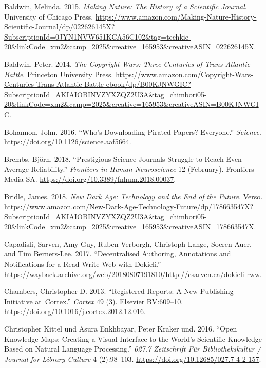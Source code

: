 \documentclass[a4paper]{article}
\begin{document}
\leavevmode\hypertarget{ref-isbn:9780226261454}{}%
Baldwin, Melinda. 2015. \emph{Making Nature: The History of a Scientific
Journal}. University of Chicago Press.
\url{https://www.amazon.com/Making-Nature-History-Scientific-Journal/dp/022626145X?SubscriptionId=0JYN1NVW651KCA56C102\&tag=techkie-20\&linkCode=xm2\&camp=2025\&creative=165953\&creativeASIN=022626145X}.

\leavevmode\hypertarget{ref-isbn:9781400851911}{}%
Baldwin, Peter. 2014. \emph{The Copyright Wars: Three Centuries of
Trans-Atlantic Battle}. Princeton University Press.
\url{https://www.amazon.com/Copyright-Wars-Centuries-Trans-Atlantic-Battle-ebook/dp/B00KJNWGIC?SubscriptionId=AKIAIOBINVZYXZQZ2U3A\&tag=chimbori05-20\&linkCode=xm2\&camp=2025\&creative=165953\&creativeASIN=B00KJNWGIC}.

\leavevmode\hypertarget{ref-doi:10.1126ux2fscience.aaf5664}{}%
Bohannon, John. 2016. ``Who's Downloading Pirated Papers? Everyone.''
\emph{Science}. \url{https://doi.org/10.1126/science.aaf5664}.

\leavevmode\hypertarget{ref-doi:10.3389ux2ffnhum.2018.00037}{}%
Brembs, Björn. 2018. ``Prestigious Science Journals Struggle to Reach
Even Average Reliability.'' \emph{Frontiers in Human Neuroscience} 12
(February). Frontiers Media SA.
\url{https://doi.org/10.3389/fnhum.2018.00037}.

\leavevmode\hypertarget{ref-isbn:9781786635471}{}%
Bridle, James. 2018. \emph{New Dark Age: Technology and the End of the
Future}. Verso.
\url{https://www.amazon.com/New-Dark-Age-Technology-Future/dp/178663547X?SubscriptionId=AKIAIOBINVZYXZQZ2U3A\&tag=chimbori05-20\&linkCode=xm2\&camp=2025\&creative=165953\&creativeASIN=178663547X}.

\leavevmode\hypertarget{ref-dokieli}{}%
Capadisli, Sarven, Amy Guy, Ruben Verborgh, Christoph Lange, Soeren
Auer, and Tim Berners-Lee. 2017. ``Decentralised Authoring, Annotations
and Notifications for a Read-Write Web with Dokieli.''
\url{https://wayback.archive.org/web/20180807191810/http://csarven.ca/dokieli-rww}.

\leavevmode\hypertarget{ref-doi:10.1016ux2fj.cortex.2012.12.016}{}%
Chambers, Christopher D. 2013. ``Registered Reports: A New Publishing
Initiative at~Cortex.'' \emph{Cortex} 49 (3). Elsevier BV:609--10.
\url{https://doi.org/10.1016/j.cortex.2012.12.016}.

\leavevmode\hypertarget{ref-doi:10.12685ux2f027.7-4-2-157}{}%
Christopher Kittel und Asura Enkhbayar, Peter Kraker und. 2016. ``Open
Knowledge Maps: Creating a Visual Interface to the World's Scientific
Knowledge Based on Natural Language Processing.'' \emph{027.7
Zeitschrift Für Bibliothekskultur / Journal for Library Culture} 4
(2):98--103. \url{https://doi.org/10.12685/027.7-4-2-157}.
\end{document}
